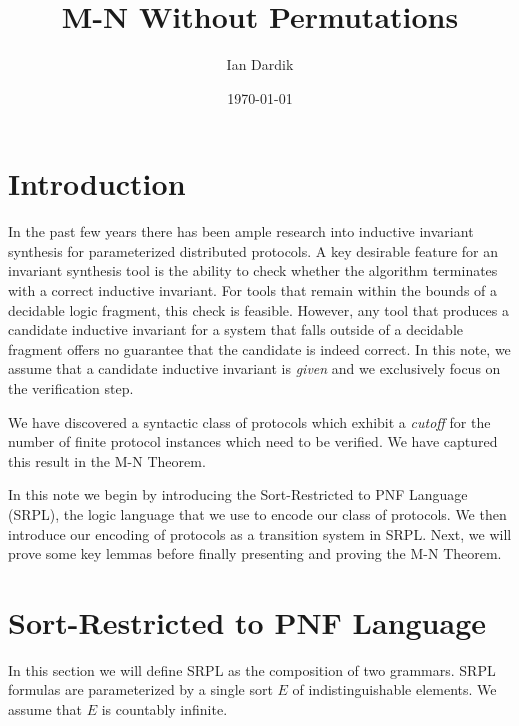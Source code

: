 \documentclass[12pt]{article}
\title{M-N Without Permutations}
\author{Ian Dardik}
\date{\today}
\theoremstyle{definition}
\theoremstyle{remark}
\begin{document}
\maketitle

\section{Introduction}
In the past few years there has been ample research into inductive invariant synthesis for parameterized distributed protocols.  A key desirable feature for an invariant synthesis tool is the ability to check whether the algorithm terminates with a correct inductive invariant.  For tools that remain within the bounds of a decidable logic fragment, this check is feasible.  However, any tool that produces a candidate inductive invariant for a system that falls outside of a decidable fragment offers no guarantee that the candidate is indeed correct.  In this note, we assume that a candidate inductive invariant is \textit{given} and we exclusively focus on the verification step.

We have discovered a syntactic class of protocols which exhibit a \textit{cutoff} for the number of finite protocol instances which need to be verified.  We have captured this result in the M-N Theorem.

In this note we begin by introducing the Sort-Restricted to PNF Language (SRPL), the logic language that we use to encode our class of protocols.  We then introduce our encoding of protocols as a transition system in SRPL.  Next, we will prove some key lemmas before finally presenting and proving the M-N Theorem.



\section{Sort-Restricted to PNF Language}

In this section we will define SRPL as the composition of two grammars.  SRPL formulas are parameterized by a single sort $E$ of indistinguishable elements.  We assume that $E$ is countably infinite.
\end{document}
